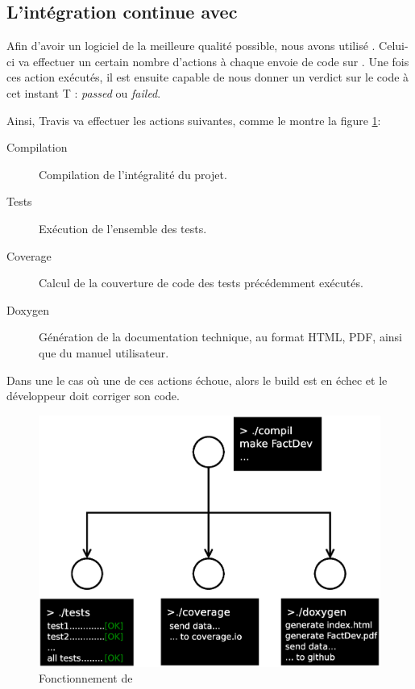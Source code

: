 \subsection{L'intégration continue avec \Travis}
Afin d'avoir un logiciel de la meilleure qualité possible, nous avons utilisé \Travis. Celui-ci va effectuer un certain nombre d'actions à chaque
envoie de code sur \Github. Une fois ces action exécutés, il est ensuite capable de nous donner un verdict sur le code à cet instant T :
\textit{passed} ou \textit{failed}.

Ainsi, Travis va effectuer les actions suivantes, comme le montre la figure \ref{fig:travis}:
\begin{description}
	\item[Compilation] Compilation de l'intégralité du projet.
	\item[Tests] Exécution de l'ensemble des tests.
	\item[Coverage] Calcul de la couverture de code des tests précédemment exécutés. 
	\item[Doxygen] Génération de la documentation technique, au format HTML, PDF, ainsi que du manuel utilisateur.
\end{description}

Dans une le cas où une de ces actions échoue, alors le build est en échec et le développeur doit corriger son code.
\begin{figure}[H]
	\centering
	\includegraphics*[width=18cm]{travis.eps}
	\caption{Fonctionnement de \Travis}
	\label{fig:travis}
\end{figure}

